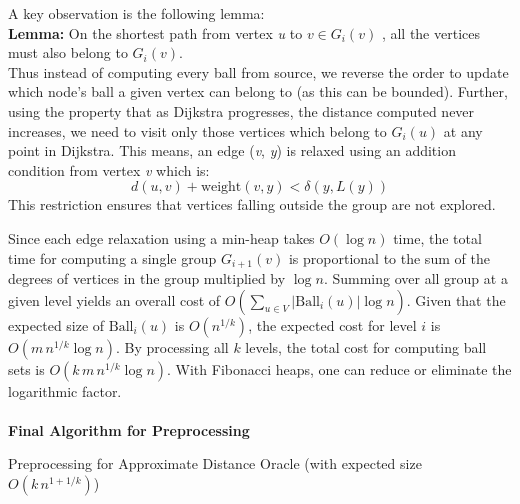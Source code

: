 \documentclass{article}
\begin{document}
A key observation is the following lemma: \\
\textbf{Lemma: } On the shortest path from vertex \textit{u} to \(v \in G_i(v)\)  , all the vertices must also belong to \(G_i(v)\). \\

Thus instead of computing every ball from source, we reverse the order to update which node's ball a given vertex can belong to (as this can be bounded). Further, using the property that as Dijkstra progresses, the distance computed never increases, we need to visit only those vertices which belong to \(G_i(u)\) at any point in Dijkstra. This means, an edge (\textit{v}, \textit{y}) is relaxed using an addition condition from vertex \textit{v} which is:
\[
d(u, v) + \text{weight}(v, y) < \delta(y, L(y))
\]
This restriction ensures that vertices falling outside the group are not explored.

Since each edge relaxation using a min-heap takes \(O(\log n)\) time, the total time for computing a single group \(G_{i+1}(v)\) is proportional to the sum of the degrees of vertices in the group multiplied by \(\log n\). Summing over all group at a given level yields an overall cost of
\(
O\left(\sum_{u \in V} |\text{Ball}_i(u)| \log n\right).
\)
Given that the expected size of \(\text{Ball}_i(u)\) is \(O(n^{1/k})\), the expected cost for level \(i\) is \(O(m\,n^{1/k}\log n)\). By processing all \(k\) levels, the total cost for computing ball sets is \(O(k\,m\,n^{1/k}\log n)\). With Fibonacci heaps, one can reduce or eliminate the logarithmic factor.
\\\\
\textbf{Final Algorithm for Preprocessing}
\begin{algorithm}[H]
    \caption{Preprocessing for Approximate Distance Oracle (with expected size \(O(k\,n^{1+1/k})\))}
    \label{alg:preprocessing}
    \begin{algorithmic}[1]
        \State {}
            \State {}
        \EndFor
                \State {}
            \EndFor
        \EndFor
        \State {}
    \EndProcedure
    \end{algorithmic}
    \end{algorithm}
\end{document}
